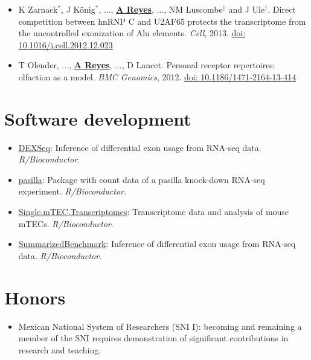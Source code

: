 \documentclass[11pt,a4paper,sans]{moderncv} %
\begin{document}
\begin{itemize}
\item K Zarnack$^{\ast}$, J K\"{o}nig$^{\ast}$, ..., \textbf{\underline{A Reyes}}, ..., NM Luscombe$^{\dagger}$ and J Ule$^{\dagger}$. Direct competition between hnRNP C and U2AF65 protects the transcriptome from the uncontrolled exonization of Alu elements. \textit{Cell}, 2013. \href{https://doi.org/10.1016/j.cell.2012.12.023}{doi: 10.1016/j.cell.2012.12.023}
\item T Olender, ..., \textbf{\underline{A Reyes}}, ..., D Lancet. Personal receptor repertoires: olfaction as a model. \textit{BMC Genomics}, 2012. \href{https://doi.org/10.1186/1471-2164-13-414}{doi: 10.1186/1471-2164-13-414}
\end{itemize}
\vspace{-.13cm}

\section{Software development}
\vspace{-.1cm}
\begin{itemize}
\item \href{http://www.bioconductor.org/packages/release/bioc/html/DEXSeq.html}{DEXSeq}: Inference of differential exon usage from RNA-seq data. \textit{R/Bioconductor}.
\item \href{http://bioconductor.org/packages/release/data/experiment/html/pasilla.html}{pasilla}: Package with count data of a pasilla knock-down RNA-seq experiment. \textit{R/Bioconductor}.
\item \href{http://bioconductor.org/packages/release/data/experiment/html/Single.mTEC.Transcriptomes.html}{Single.mTEC.Transcriptomes}: Transcriptome data and analysis of mouse mTECs. \textit{R/Bioconductor}.
\item \href{http://www.bioconductor.org/packages/release/bioc/html/SummarizedBenchmark.html}{SummarizedBenchmark}: Inference of differential exon usage from RNA-seq data. \textit{R/Bioconductor}.
\end{itemize}
\vspace{-.2cm}

\section{Honors}
\begin{itemize}
\item Mexican National System of Researchers (SNI I): becoming and
  remaining a member of the SNI requires demonstration of significant contributions in
  research and teaching.\\
\end{itemize}
\end{document}
